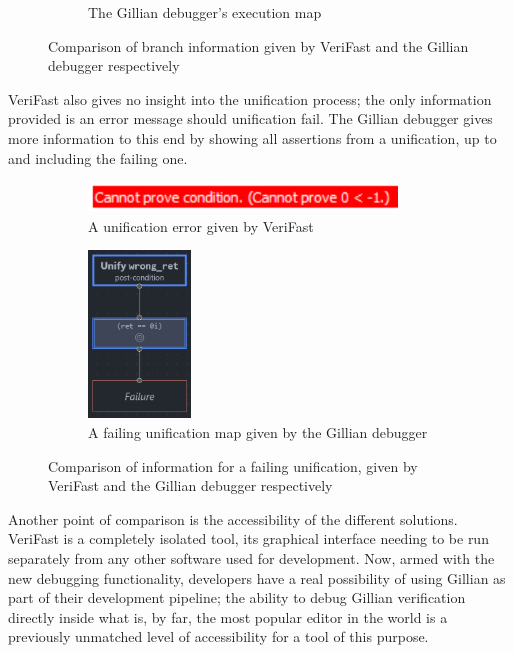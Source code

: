 \begin{figure}
\begin{subfigure}[b]{0.4\textwidth}
    \caption{The Gillian debugger's execution map}%
    \label{fig:execmap-final}
  \end{subfigure}
  \caption{Comparison of branch information given by VeriFast and the Gillian
  debugger respectively}%
  \label{fig:verifast-path-compare}
\end{figure}

VeriFast also gives no insight into the unification process; the only
information provided is an error message should unification fail. The Gillian
debugger gives more information to this end by showing all assertions from
a unification, up to and including the failing one.

\begin{figure}
  \centering
  \begin{subfigure}[b]{0.4\textwidth}
    \center{}
    \includegraphics[width=0.9\textwidth]{img/verifast-error.png}
    \caption{A unification error given by VeriFast}%
    \label{fig:verifast-error}
  \end{subfigure}
  \qquad
  \begin{subfigure}[b]{0.4\textwidth}
    \centering
    \includegraphics[width=0.3\textwidth]{img/unifymap-failure.png}
    \caption{A failing unification map given by the Gillian debugger}%
    \label{fig:unifymap-failure}
  \end{subfigure}
  \caption{Comparison of information for a failing unification, given by
  VeriFast and the Gillian debugger respectively}%
  \label{fig:verifast-unifyfail-compare}
\end{figure}

Another point of comparison is the accessibility of the different solutions.
VeriFast is a completely isolated tool, its graphical interface needing to be
run separately from any other software used for development. Now, armed with the
new debugging functionality, developers have a real possibility of using Gillian
as part of their development pipeline; the ability to debug Gillian verification
directly inside  what is, by far, the most popular editor in the world is a
previously unmatched level of accessibility for a tool of this purpose.

